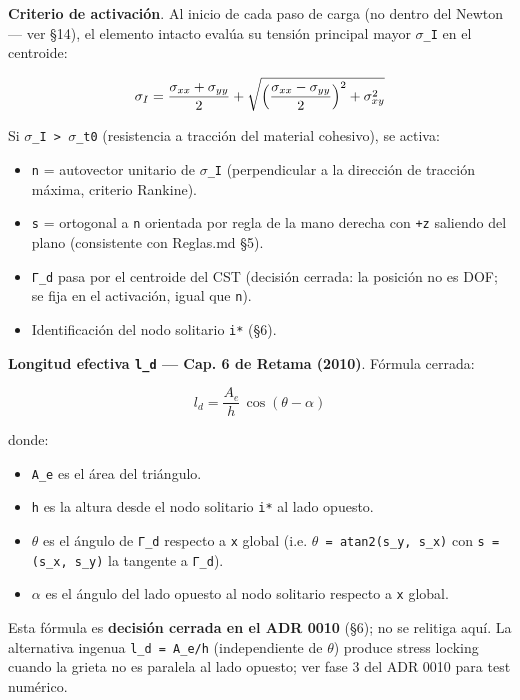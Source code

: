 \documentclass[11pt,letterpaper,oneside]{report}
\begin{document}
\textbf{Criterio de activación}. Al inicio de cada paso de carga (no dentro del Newton --- ver §14), el elemento intacto evalúa su tensión principal mayor \texttt{\ensuremath{\sigma}\_I} en el centroide:

\[
\sigma_I = \frac{\sigma_{xx} + \sigma_{yy}}{2} + \sqrt{\Bigl(\frac{\sigma_{xx} - \sigma_{yy}}{2}\Bigr)^2 + \sigma_{xy}^2}
\]

Si \texttt{\ensuremath{\sigma}\_I > \ensuremath{\sigma}\_t0} (resistencia a tracción del material cohesivo), se activa:

\begin{itemize}
  \item \texttt{n} = autovector unitario de \texttt{\ensuremath{\sigma}\_I} (perpendicular a la dirección de tracción máxima, criterio Rankine).
  \item \texttt{s} = ortogonal a \texttt{n} orientada por regla de la mano derecha con \texttt{+z} saliendo del plano (consistente con Reglas.md §5).
  \item \texttt{Γ\_d} pasa por el centroide del CST (decisión cerrada: la posición no es DOF; se fija en el activación, igual que \texttt{n}).
  \item Identificación del nodo solitario \texttt{i*} (§6).
\end{itemize}

\textbf{Longitud efectiva \texttt{l\_d} --- Cap. 6 de Retama (2010)}. Fórmula cerrada:

\[
\boxed{\;l_d = \frac{A_e}{h}\,\cos(\theta - \alpha)\;}
\]

donde:
\begin{itemize}
  \item \texttt{A\_e} es el área del triángulo.
  \item \texttt{h} es la altura desde el nodo solitario \texttt{i*} al lado opuesto.
  \item \texttt{\ensuremath{\theta}} es el ángulo de \texttt{Γ\_d} respecto a \texttt{x} global (i.e. \texttt{\ensuremath{\theta} = atan2(s\_y, s\_x)} con \texttt{s = (s\_x, s\_y)} la tangente a \texttt{Γ\_d}).
  \item \texttt{\ensuremath{\alpha}} es el ángulo del lado opuesto al nodo solitario respecto a \texttt{x} global.
\end{itemize}

Esta fórmula es \textbf{decisión cerrada en el ADR 0010} (§6); no se relitiga aquí. La alternativa ingenua \texttt{l\_d = A\_e/h} (independiente de \texttt{\ensuremath{\theta}}) produce stress locking cuando la grieta no es paralela al lado opuesto; ver fase 3 del ADR 0010 para test numérico.
\end{document}
